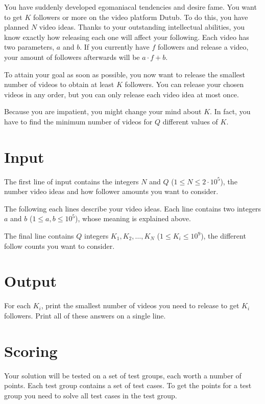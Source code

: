 
\noindent
You have suddenly developed egomaniacal tendencies and desire fame. You want to get $K$ followers or more on the video platform
Dutub. To do this, you have planned $N$ video ideas. Thanks to your outstanding intellectual abilities, you know exactly
how releasing each one will affect your following. Each video has two parameters, $a$ and $b$. If you currently have $f$ followers
and release a video, your amount of followers afterwards will be $a \cdot f + b$. 

To attain your goal as soon as possible, you now want to release the smallest number of videos to obtain at least $K$ followers.
You can release your chosen videos in any order, but you can only release each video idea at most once.

Because you are impatient, you might change your mind about $K$. In fact, you have to find the minimum number of videos
for $Q$ different values of $K$.

\section*{Input}
The first line of input contains the integers $N$ and $Q$ ($1 \le N \le 2 \cdot 10^5$), the number video ideas
and how follower amounts you want to consider.

The following each lines describe your video ideas. Each line contains two integers $a$ and $b$ ($1 \leq a, b \leq 10^5$),
whose meaning is explained above.

The final line contains $Q$ integers $K_1, K_2, \dots, K_N$ ($1 \leq K_i \leq 10^9$), the different follow counts
you want to consider.

\section*{Output}
For each $K_i$, print the smallest number of videos you need to release to get $K_i$ followers.
Print all of these answers on a single line.

\section*{Scoring}
Your solution will be tested on a set of test groups, each worth a number of points. Each test group contains
a set of test cases. To get the points for a test group you need to solve all test cases in the test group.

